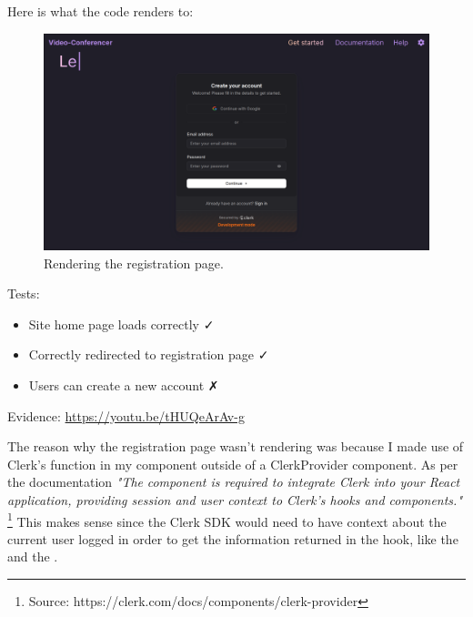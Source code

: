 Here is what the code renders to:

\begin{figure}[H]
\centering

\includegraphics[scale=0.2]{Images/Registration.png}

\caption{Rendering the registration page.}
\end{figure}

{\color{gray} \hrulefill}
\vspace{0.2cm}

{\sffamily Tests:}
\begin{itemize}
  \item Site home page loads correctly \faCheck \\
  \item Correctly redirected to registration page \faCheck \\
  \item Users can create a new account \faClose \\
\end{itemize}

{\sffamily Evidence: \url{https://youtu.be/tHUQeArAv-g}}

{\color{gray} \hrulefill}
\vspace{0.2cm}

The reason why the registration page wasn't rendering was because
I made use of Clerk's  function in my
 component outside of a ClerkProvider component.
As per the documentation \textit{"The}
 \textit{component is required to integrate
Clerk into your React application, providing session and user
context to Clerk's hooks and components."}
\footnote{Source: https://clerk.com/docs/components/clerk-provider}
This makes sense since
the Clerk SDK would need to have context about the current user
logged in order to get the information returned in the
 hook, like the  and the
. \\ \vspace{0.2cm}

